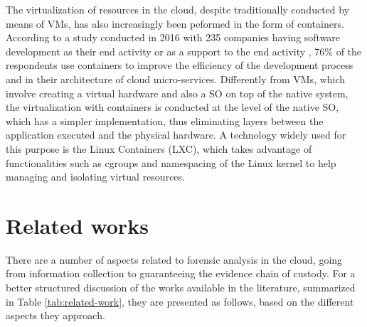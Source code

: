\documentclass[conference]{IEEEtran}
\begin{document}
The virtualization of resources in the cloud, despite traditionally conducted by means of VMs, has also increasingly been peformed in the form of containers.
%
According to a study conducted in 2016 with 235 companies having software development as their end activity or as a support to the end activity \cite{container-survey:2016}, 76\% of the respondents use containers to improve the efficiency of the development process and in their architecture of cloud micro-services.
%
Differently from VMs, which involve creating a virtual hardware and also a SO on top of the native system, the virtualization with containers is conducted at the level of the native SO, which has a simpler implementation, thus eliminating layers between the application executed and the physical hardware.
%
A technology widely used for this purpose is the Linux Containers (LXC), which takes advantage of functionalities such as cgroups and namespacing of the Linux kernel to help managing and isolating virtual resources.



\section{Related works}
\label{sec:related}

There are a number of aspects related to forensic analysis in the cloud, going from information collection to guaranteeing the evidence chain of custody.
%
For a better structured discussion of the works available in the literature, summarized in Table \ref{tab:related-work}, they are presented as follows, based on the different aspects they approach.
\end{document}
